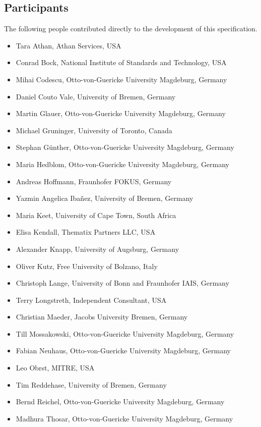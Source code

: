 \documentclass[10pt,fleqn,final]{scrreprt}
\newenvironment{definitions}[0]{\medskip }{}
\begin{document}
\begin{definitions}
\subsection{Participants}
The following people contributed directly to the development of this specification. 
	\begin{itemize}
	\item Tara Athan, Athan Services, USA 
	\item Conrad Bock, National Institute of Standards and Technology, USA
	\item Mihai Codescu, Otto-von-Guericke University Magdeburg, Germany 
        \item Daniel Couto Vale, University of Bremen, Germany
        \item Martin Glauer, Otto-von-Guericke University Magdeburg, Germany
	\item Michael Gruninger, University of Toronto, Canada  
        \item Stephan Günther, Otto-von-Guericke University Magdeburg, Germany
        \item Maria Hedblom, Otto-von-Guericke University Magdeburg, Germany
	\item Andreas Hoffmann, Fraunhofer FOKUS, Germany 
        \item Yazmin Angelica Iba\~nez, University of Bremen, Germany
	\item Maria Keet, University of Cape Town, South Africa 
	\item Elisa Kendall, Thematix Partners LLC, USA	
        \item Alexander Knapp, University of Augsburg, Germany
	\item Oliver Kutz, Free University of Bolzano, Italy
	\item Christoph Lange, University of Bonn and Fraunhofer IAIS, Germany
	\item Terry Longstreth, Independent Consultant, USA 	
        \item Christian Maeder, Jacobs University Bremen, Germany
	\item Till Mossakowski, Otto-von-Guericke University Magdeburg, Germany  	
	\item Fabian Neuhaus, Otto-von-Guericke University Magdeburg, Germany  	  
	\item Leo Obrst, MITRE, USA
        \item Tim Reddehase, University of Bremen, Germany
	\item Bernd Reichel, Otto-von-Guericke University Magdeburg, Germany  	        \item Madhura Thosar, Otto-von-Guericke University Magdeburg, Germany
   

\end{itemize}
\end{definitions}
\end{document}
